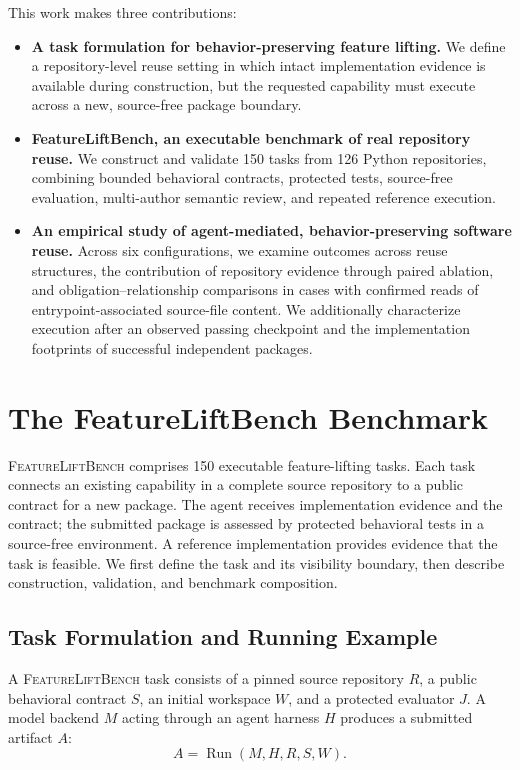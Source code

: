 \documentclass[acmsmall,screen,review,anonymous]{acmart}
\newcommand{\flb}{\textsc{FeatureLiftBench}\xspace}
\begin{document}
This work makes three contributions:
\begin{itemize}
  \item \textbf{A task formulation for behavior-preserving feature lifting.}
  We define a repository-level reuse setting in which intact implementation
  evidence is available during construction, but the requested capability must
  execute across a new, source-free package boundary.

  \item \textbf{FeatureLiftBench, an executable benchmark of real repository
  reuse.} We construct and validate 150 tasks from 126 Python repositories,
  combining bounded behavioral contracts, protected tests, source-free
  evaluation, multi-author semantic review, and repeated reference execution.

  \item \textbf{An empirical study of agent-mediated, behavior-preserving
  software reuse.} Across six configurations, we examine outcomes across reuse
  structures, the contribution of repository evidence through paired ablation,
  and obligation--relationship comparisons in cases with confirmed reads of
  entrypoint-associated source-file content. We additionally characterize
  execution after an observed passing checkpoint and the implementation
  footprints of successful independent packages.
\end{itemize}

\section{The FeatureLiftBench Benchmark}
\label{sec:benchmark}

\flb comprises 150 executable feature-lifting tasks. Each task connects an
existing capability in a complete source repository to a public contract for a
new package. The agent receives implementation evidence and the contract; the
submitted package is assessed by protected behavioral tests in a source-free
environment. A reference implementation provides evidence that the task is
feasible. We first define the task and its visibility boundary, then describe
construction, validation, and benchmark composition.

\subsection{Task Formulation and Running Example}

A \flb task consists of a pinned source repository $R$, a public behavioral
contract $S$, an initial workspace $W$, and a protected evaluator $J$. A model
backend $M$ acting through an agent harness $H$ produces a submitted artifact
$A$:
\begin{equation}
  A = \operatorname{Run}(M,H,R,S,W).
\end{equation}
\end{document}
